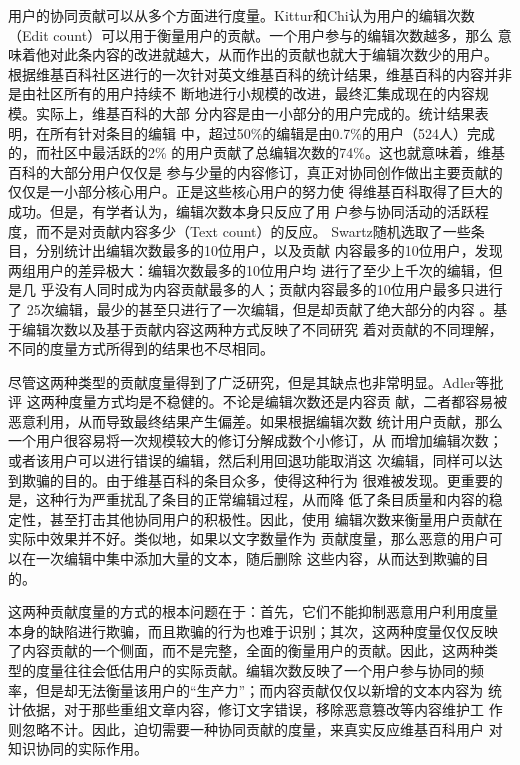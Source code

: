 用户的协同贡献可以从多个方面进行度量。Kittur和Chi认为用户的编辑次数
（Edit count）可以用于衡量用户的贡献。一个用户参与的编辑次数越多，那么
意味着他对此条内容的改进就越大，从而作出的贡献也就大于编辑次数少的用户。
根据维基百科社区进行的一次针对英文维基百科的统计结果，维基百科的内容并非是由社区所有的用户持续不
断地进行小规模的改进，最终汇集成现在的内容规模。实际上，维基百科的大部
分内容是由一小部分的用户完成的。统计结果表明，在所有针对条目的编辑
中，超过50\%的编辑是由0.7\%的用户（524人）完成的，而社区中最活跃的2\%
的用户贡献了总编辑次数的74\%。这也就意味着，维基百科的大部分用户仅仅是
参与少量的内容修订，真正对协同创作做出主要贡献的仅仅是一小部分核心用户。正是这些核心用户的努力使
 得维基百科取得了巨大的成功。但是，有学者认为，编辑次数本身只反应了用
 户参与协同活动的活跃程度，而不是对贡献内容多少（Text count）的反应。
 Swartz随机选取了一些条目，分别统计出编辑次数最多的10位用户，以及贡献
 内容最多的10位用户，发现两组用户的差异极大：编辑次数最多的10位用户均
 进行了至少上千次的编辑，但是几
 乎没有人同时成为内容贡献最多的人；贡献内容最多的10位用户最多只进行了
 25次编辑，最少的甚至只进行了一次编辑，但是却贡献了绝大部分的内容
 \cite{aswartz}。基于编辑次数以及基于贡献内容这两种方式反映了不同研究
 着对贡献的不同理解，不同的度量方式所得到的结果也不尽相同。

尽管这两种类型的贡献度量得到了广泛研究，但是其缺点也非常明显。Adler等批评
 这两种度量方式均是不稳健的\cite{Adler2008}。不论是编辑次数还是内容贡
 献，二者都容易被恶意利用，从而导致最终结果产生偏差。如果根据编辑次数
 统计用户贡献，那么一个用户很容易将一次规模较大的修订分解成数个小修订，从
 而增加编辑次数；或者该用户可以进行错误的编辑，然后利用回退功能取消这
 次编辑，同样可以达到欺骗的目的。由于维基百科的条目众多，使得这种行为
 很难被发现。更重要的是，这种行为严重扰乱了条目的正常编辑过程，从而降
 低了条目质量和内容的稳定性，甚至打击其他协同用户的积极性。因此，使用
 编辑次数来衡量用户贡献在实际中效果并不好。类似地，如果以文字数量作为
 贡献度量，那么恶意的用户可以在一次编辑中集中添加大量的文本，随后删除
 这些内容，从而达到欺骗的目的。

这两种贡献度量的方式的根本问题在于：首先，它们不能抑制恶意用户利用度量
本身的缺陷进行欺骗，而且欺骗的行为也难于识别；其次，这两种度量仅仅反映
了内容贡献的一个侧面，而不是完整，全面的衡量用户的贡献。因此，这两种类
型的度量往往会低估用户的实际贡献。编辑次数反映了一个用户参与协同的频
率，但是却无法衡量该用户的“生产力”；而内容贡献仅仅以新增的文本内容为
统计依据，对于那些重组文章内容，修订文字错误，移除恶意篡改等内容维护工
作则忽略不计。因此，迫切需要一种协同贡献的度量，来真实反应维基百科用户
对知识协同的实际作用。

